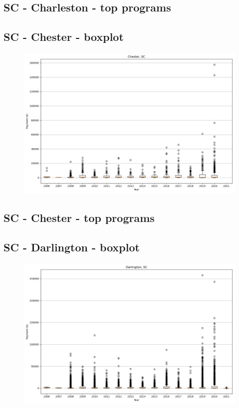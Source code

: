 \subsection*{SC - Charleston - top programs}

\newpage
\subsection*{SC - Chester - boxplot}
\begin{figure}[h]
\centering
\includegraphics[width=7in]{../output/boxplots/counties/Chester-SC_boxplot.png}
\end{figure}


\subsection*{SC - Chester - top programs}

\newpage
\subsection*{SC - Darlington - boxplot}
\begin{figure}[h]
\centering
\includegraphics[width=7in]{../output/boxplots/counties/Darlington-SC_boxplot.png}
\end{figure}


